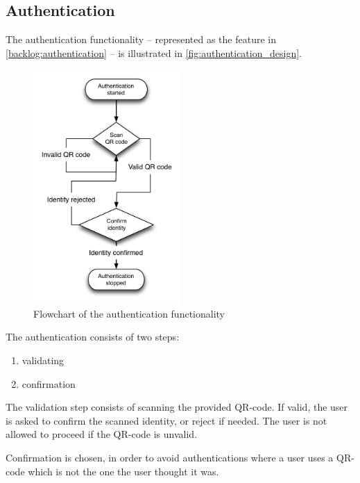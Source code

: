 \subsection{Authentication}
\label{design:authentication}
The authentication functionality -- represented as the  feature in \autoref{backlog:authentication} -- is illustrated in \autoref{fig:authentication_design}. 
\begin{figure}[h]
	\centering
	\includegraphics[width=0.5\textwidth]{gfx/authentication_design.pdf}
	\caption{Flowchart of the authentication functionality}
	\label{fig:authentication_design}
\end{figure}

\noindent The authentication consists of two steps:

\begin{enumerate}
	\item validating
	\item confirmation
\end{enumerate}

The validation step consists of scanning the provided QR-code. If valid, the user is asked to confirm the scanned identity, or reject if needed. The user is not allowed to proceed if the QR-code is unvalid.

Confirmation is chosen, in order to avoid authentications where a user uses a QR-code which is not the one the user thought it was.


